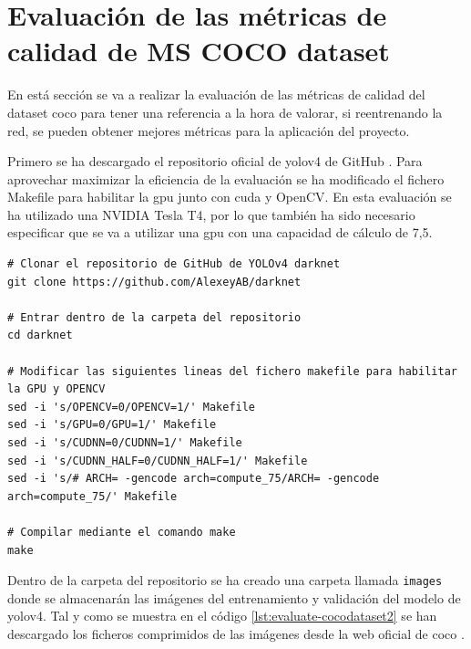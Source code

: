 \section{Evaluación de las métricas de calidad de MS COCO dataset}
\label{sec:evaluate-cocodataset}

En está sección se va a realizar la evaluación de las métricas de calidad del dataset \gls{coco} para tener una referencia a la hora de valorar, si reentrenando la red, se pueden obtener mejores métricas para la aplicación del proyecto.

Primero se ha descargado el repositorio oficial de \gls{yolov4} de GitHub \cite{yolov4-darknet-github}. Para aprovechar maximizar la eficiencia de la evaluación se ha modificado el fichero Makefile para habilitar la \gls{gpu} junto con \gls{cuda} y OpenCV. En esta evaluación se ha utilizado una NVIDIA Tesla T4, por lo que también ha sido necesario especificar que se va a utilizar una \gls{gpu} con una capacidad de cálculo de 7,5.

\vspace{0.5cm}
\begin{lstlisting}[language=iPython,caption=Evaluación de las métricas de calidad de MS COCO en YOLOv4 Darknet (1),captionpos=b,label={lst:evaluate-cocodataset1}]
# Clonar el repositorio de GitHub de YOLOv4 darknet
git clone https://github.com/AlexeyAB/darknet

# Entrar dentro de la carpeta del repositorio
cd darknet

# Modificar las siguientes lineas del fichero makefile para habilitar la GPU y OPENCV
sed -i 's/OPENCV=0/OPENCV=1/' Makefile
sed -i 's/GPU=0/GPU=1/' Makefile
sed -i 's/CUDNN=0/CUDNN=1/' Makefile
sed -i 's/CUDNN_HALF=0/CUDNN_HALF=1/' Makefile
sed -i 's/# ARCH= -gencode arch=compute_75/ARCH= -gencode arch=compute_75/' Makefile

# Compilar mediante el comando make
make
\end{lstlisting}

Dentro de la carpeta del repositorio se ha creado una carpeta llamada \texttt{images} donde se almacenarán las imágenes del entrenamiento y validación del modelo de \gls{yolov4}. Tal y como se muestra en el código \ref{lst:evaluate-cocodataset2} se han descargado los ficheros comprimidos de las imágenes desde la web oficial de \gls{coco} \cite{coco-official-website}.

